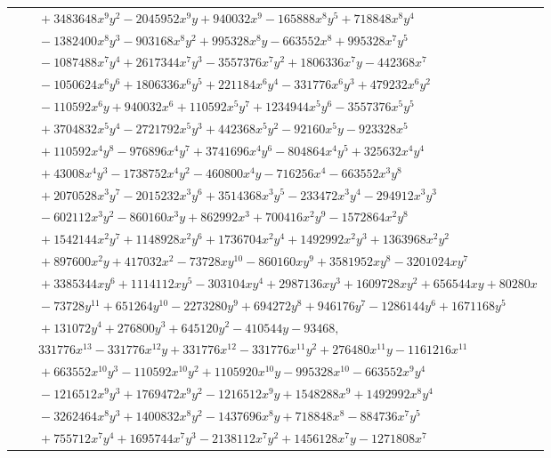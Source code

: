 \documentclass[11pt]{article}
\begin{document}
\begin{longtable}{@{}ll@{}}
 & $\quad +3483648x^{9}y^{2}-2045952x^{9}y+940032x^{9}-165888x^{8}y^{5}+718848x^{8}y^{4}$\\
 & $\quad -1382400x^{8}y^{3}-903168x^{8}y^{2}+995328x^{8}y-663552x^{8}+995328x^{7}y^{5}$\\
 & $\quad -1087488x^{7}y^{4}+2617344x^{7}y^{3}-3557376x^{7}y^{2}+1806336x^{7}y-442368x^{7}$\\
 & $\quad -1050624x^{6}y^{6}+1806336x^{6}y^{5}+221184x^{6}y^{4}-331776x^{6}y^{3}+479232x^{6}y^{2}$\\
 & $\quad -110592x^{6}y+940032x^{6}+110592x^{5}y^{7}+1234944x^{5}y^{6}-3557376x^{5}y^{5}$\\
 & $\quad +3704832x^{5}y^{4}-2721792x^{5}y^{3}+442368x^{5}y^{2}-92160x^{5}y-923328x^{5}$\\
 & $\quad +110592x^{4}y^{8}-976896x^{4}y^{7}+3741696x^{4}y^{6}-804864x^{4}y^{5}+325632x^{4}y^{4}$\\
 & $\quad +43008x^{4}y^{3}-1738752x^{4}y^{2}-460800x^{4}y-716256x^{4}-663552x^{3}y^{8}$\\
 & $\quad +2070528x^{3}y^{7}-2015232x^{3}y^{6}+3514368x^{3}y^{5}-233472x^{3}y^{4}-294912x^{3}y^{3}$\\
 & $\quad -602112x^{3}y^{2}-860160x^{3}y+862992x^{3}+700416x^{2}y^{9}-1572864x^{2}y^{8}$\\
 & $\quad +1542144x^{2}y^{7}+1148928x^{2}y^{6}+1736704x^{2}y^{4}+1492992x^{2}y^{3}+1363968x^{2}y^{2}$\\
 & $\quad +897600x^{2}y+417032x^{2}-73728xy^{10}-860160xy^{9}+3581952xy^{8}-3201024xy^{7}$\\
 & $\quad +3385344xy^{6}+1114112xy^{5}-303104xy^{4}+2987136xy^{3}+1609728xy^{2}+656544xy+80280x$\\
 & $\quad -73728y^{11}+651264y^{10}-2273280y^{9}+694272y^{8}+946176y^{7}-1286144y^{6}+1671168y^{5}$\\
 & $\quad +131072y^{4}+276800y^{3}+645120y^{2}-410544y-93468,$\\
 & $\quad 331776x^{13}-331776x^{12}y+331776x^{12}-331776x^{11}y^{2}+276480x^{11}y-1161216x^{11}$\\
 & $\quad +663552x^{10}y^{3}-110592x^{10}y^{2}+1105920x^{10}y-995328x^{10}-663552x^{9}y^{4}$\\
 & $\quad -1216512x^{9}y^{3}+1769472x^{9}y^{2}-1216512x^{9}y+1548288x^{9}+1492992x^{8}y^{4}$\\
 & $\quad -3262464x^{8}y^{3}+1400832x^{8}y^{2}-1437696x^{8}y+718848x^{8}-884736x^{7}y^{5}$\\
 & $\quad +755712x^{7}y^{4}+1695744x^{7}y^{3}-2138112x^{7}y^{2}+1456128x^{7}y-1271808x^{7}$\\

\end{longtable}
\end{document}
